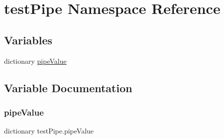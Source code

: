 \hypertarget{namespacetest_pipe}{}\section{test\+Pipe Namespace Reference}
\label{namespacetest_pipe}
\subsection*{Variables}
\begin{DoxyCompactItemize}
\item 
dictionary \hyperlink{namespacetest_pipe_a8aff15ad31deb98086aa4430ea086744}{pipe\+Value}
\end{DoxyCompactItemize}


\subsection{Variable Documentation}
\mbox{\label{namespacetest_pipe_a8aff15ad31deb98086aa4430ea086744}} 
\subsubsection{\texorpdfstring{pipe\+Value}{pipeValue}}
{\footnotesize\ttfamily dictionary test\+Pipe.\+pipe\+Value}

